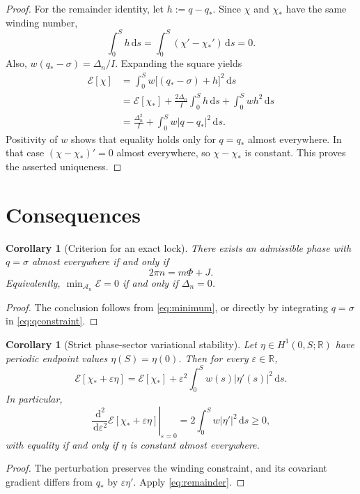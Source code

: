 \documentclass[11pt]{article}
\newtheorem{corollary}[theorem]{Corollary}
\newcommand{\dd}{\,\mathrm{d}}
\newcommand{\RR}{\mathbb{R}}
\newcommand{\E}{\mathcal{E}}
\begin{document}
\begin{proof}
For the remainder identity, let $h:=q-q_*$.  Since $\chi$ and $\chi_*$
have the same winding number,
\begin{equation}
  \int_0^S h\dd s
  =\int_0^S(\chi'-\chi_*')\dd s=0.
  \label{eq:hzero}
\end{equation}
Also, $w(q_*-\sigma)=\Delta_n/I$.  Expanding the square yields
\begin{align}
 \E[\chi]
 &=\int_0^S w\bigl[(q_*-\sigma)+h\bigr]^2\dd s\\
 &=\E[\chi_*]
   +\frac{2\Delta_n}{I}\int_0^S h\dd s
   +\int_0^S wh^2\dd s\\
 &=\frac{\Delta_n^2}{I}+\int_0^S w\lvert q-q_*\rvert^2\dd s.
\end{align}
Positivity of $w$ shows that equality holds only for $q=q_*$ almost
everywhere.  In that case $(\chi-\chi_*)'=0$ almost everywhere,
so $\chi-\chi_*$ is constant.  This proves the asserted uniqueness.
\end{proof}

\section{Consequences}

\begin{corollary}[Criterion for an exact lock]
\label{cor:lock}
There exists an admissible phase with $q=\sigma$ almost everywhere if and
only if
\begin{equation}
  \boxed{2\pi n=m\Phi+J.}
\end{equation}
Equivalently, $\min_{\mathcal{A}_n}\E=0$ if and only if $\Delta_n=0$.
\end{corollary}
\begin{proof}
The conclusion follows from \eqref{eq:minimum}, or directly by integrating
$q=\sigma$ in \eqref{eq:qconstraint}.
\end{proof}

\begin{corollary}[Strict phase-sector variational stability]
\label{cor:stability}
Let $\eta\in H^1(0,S;\RR)$ have periodic endpoint values
$\eta(S)=\eta(0)$.  Then for every $\varepsilon\in\RR$,
\begin{equation}
  \E[\chi_*+\varepsilon\eta]
  =\E[\chi_*]
   +\varepsilon^2\int_0^S w(s)\lvert\eta'(s)\rvert^2\dd s.
  \label{eq:perturb}
\end{equation}
In particular,
\begin{equation}
  \left.\frac{\dd^2}{\dd\varepsilon^2}
      \E[\chi_*+\varepsilon\eta]\right|_{\varepsilon=0}
  =2\int_0^S w\lvert\eta'\rvert^2\dd s\geq0,
\end{equation}
with equality if and only if $\eta$ is constant almost everywhere.
\end{corollary}
\begin{proof}
The perturbation preserves the winding constraint, and its covariant
gradient differs from $q_*$ by $\varepsilon\eta'$.  Apply
\eqref{eq:remainder}.
\end{proof}
\end{document}
